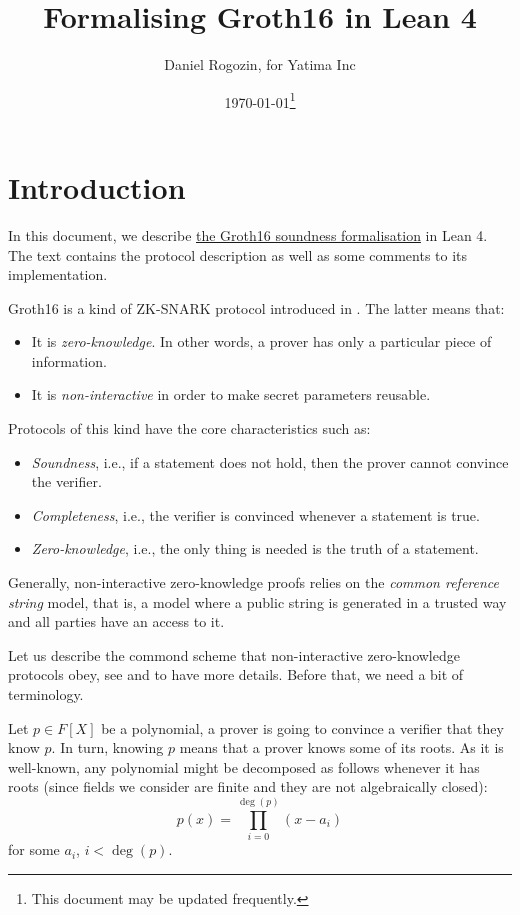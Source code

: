 \documentclass{article}
\title{Formalising Groth16 in Lean 4}
\author{Daniel Rogozin, for Yatima Inc}
\date{\today\footnote{This document may be updated frequently.}}
\theoremstyle{definition}
\theoremstyle{remark}
\begin{document}
\maketitle

\section{Introduction}

In this document, we describe \href{https://github.com/yatima-inc/ZKSnark.lean/blob/main/ZkSNARK/Groth16/KnowledgeSoundness.lean}{the Groth16 soundness formalisation} in Lean 4.
The text contains the protocol description as well as some comments to its implementation.

Groth16 is a kind of ZK-SNARK protocol introduced in \cite{groth2016size}. The latter means that:

\begin{itemize}
\item It is \emph{zero-knowledge}. In other words, a prover has only a particular piece of information.
\item It is \emph{non-interactive} in order to make secret parameters reusable.
\end{itemize}

Protocols of this kind have the core characteristics such as:
\begin{itemize}
\item \emph{Soundness}, i.e., if a statement does not hold, then the prover cannot convince the verifier.
\item \emph{Completeness}, i.e., the verifier is convinced whenever a statement is true.
\item \emph{Zero-knowledge}, i.e., the only thing is needed is the truth of a statement.
\end{itemize}

Generally, non-interactive zero-knowledge proofs relies on the \emph{common reference string} model, that is, a model where a public string is generated in a trusted way and all parties have an access to it.

Let us describe the commond scheme that non-interactive zero-knowledge protocols obey, see \cite{petkus2019and} and \cite{bitansky2012extractable} to have more details. Before that, we need a bit of terminology.

Let $p \in F[X]$ be a polynomial, a prover is going to convince a verifier that they know $p$. In turn, knowing $p$ means that a prover knows some of its roots. As it is well-known, any polynomial might be decomposed as follows whenever it has roots (since fields we consider are finite and they are not algebraically closed):
\begin{equation}
p(x) = \prod_{i = 0}^{\deg(p)} (x - a_i)
\end{equation}
for some $a_i$, $i < \deg(p)$.
\end{document}
